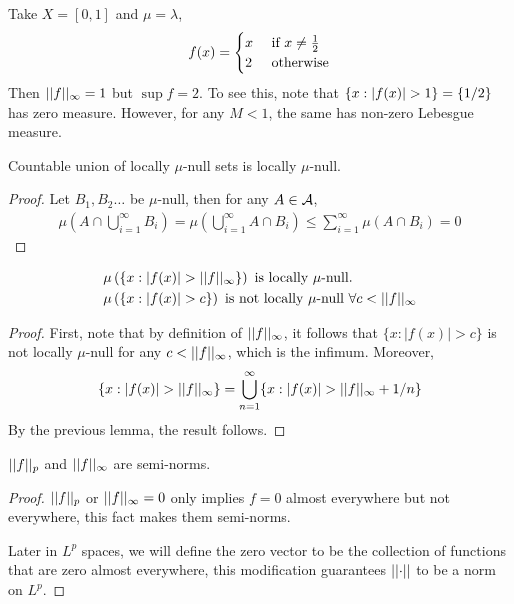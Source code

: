 \documentclass[11pt]{article}
\begin{document}
	\begin{example}
		Take $X = [0, 1]$ and $\mu = \lambda$,
		\begin{align}
			f(x) = \begin{cases}
				x &\text{{ if }} x \neq \frac{1}{2} \\
				2 &\text{{ otherwise}}
			\end{cases}
		\end{align}
		Then $\vert \vert {f} \vert \vert_\infty=1$ but $\sup f = 2$. To see this, note that $\{x : \left \vert {f(x)} \right \vert > 1\} = \{1/2\}$ has zero measure. However, for any $M < 1$, the same has non-zero Lebesgue measure.
	\end{example}

	\begin{lemma}
		Countable union of locally $\mu$-null sets is locally $\mu$-null.
		\begin{proof}
			Let $B_1, B_2 \dots$ be $\mu$-null, then for any $A \in \mathcal{{A}}$,
			\begin{align}
				\mu\left(A \cap \bigcup_{i=1}^\infty B_i\right) = \mu\left(\bigcup_{i=1}^\infty A \cap B_i \right) \leq \sum_{i=1}^\infty \mu(A\cap B_i) = 0
			\end{align}
		\end{proof}
	\end{lemma}

	\begin{proposition}
		\begin{align}
			&\mu\left(\{
			x : \left \vert {f(x)} \right \vert > \vert \vert {f} \vert \vert_\infty
			\}\right) \text{{ is locally $\mu$-null.}} \\
			&\mu\left(\{
			x : \left \vert {f(x)} \right \vert > c
			\}\right) \text{{ is not locally $\mu$-null }} \forall c < \vert \vert {f} \vert \vert_\infty
		\end{align}
		\begin{proof}
			First, note that by definition of $\vert \vert {f} \vert \vert_\infty$, it follows that $\{x: |f(x)| > c\}$ is not locally $\mu$-null for any $c < \vert \vert {f} \vert \vert_\infty$, which is the infimum.
			Moreover,
			\begin{align}
				\{x : |f(x)| > \vert \vert {f} \vert \vert_\infty\} = \bigcup_{n=1}^\infty \{x : |f(x)| > \vert \vert {f} \vert \vert_\infty + 1/n\}
			\end{align}
			By the previous lemma, the result follows.
		\end{proof}
	\end{proposition}
	
	\begin{proposition}
		$\vert \vert {f} \vert \vert_p$ and $\vert \vert {f} \vert \vert_\infty$ are semi-norms.
		\begin{proof}
			$\vert \vert {f} \vert \vert_p$ or $\vert \vert {f} \vert \vert_\infty = 0$ only implies $f = 0$ almost everywhere but not everywhere, this fact makes them semi-norms.
			
			Later in $L^p$ spaces, we will define the zero vector to be the collection of functions that are zero almost everywhere, this modification guarantees $\vert \vert {\cdot} \vert \vert$ to be a norm on $L^p$.
		\end{proof}
	\end{proposition}
	
\end{document}
